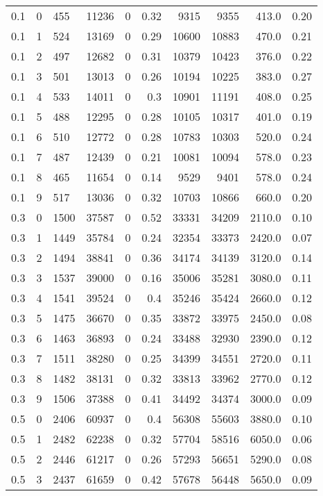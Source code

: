 \documentclass{scrartcl}
\theoremstyle{plain}
\begin{document}
\begin{table}[!ht]
\begin{tabular}{|lll|rrr|rrr|r|}
\makeatletter{}0.1 & 0 & 455 & 11236 & 0  & 0.32 & 9315 & 9355 & 413.0 & 0.20 \\ 
 0.1 & 1 & 524 & 13169 & 0  & 0.29 & 10600 & 10883 & 470.0 & 0.21 \\ 
 0.1 & 2 & 497 & 12682 & 0  & 0.31 & 10379 & 10423 & 376.0 & 0.22 \\ 
 0.1 & 3 & 501 & 13013 & 0  & 0.26 & 10194 & 10225 & 383.0 & 0.27 \\ 
 0.1 & 4 & 533 & 14011 & 0  & 0.3 & 10901 & 11191 & 408.0 & 0.25 \\ 
 0.1 & 5 & 488 & 12295 & 0  & 0.28 & 10105 & 10317 & 401.0 & 0.19 \\ 
 0.1 & 6 & 510 & 12772 & 0  & 0.28 & 10783 & 10303 & 520.0 & 0.24 \\ 
 0.1 & 7 & 487 & 12439 & 0  & 0.21 & 10081 & 10094 & 578.0 & 0.23 \\ 
 0.1 & 8 & 465 & 11654 & 0  & 0.14 & 9529 & 9401 & 578.0 & 0.24 \\ 
 0.1 & 9 & 517 & 13036 & 0  & 0.32 & 10703 & 10866 & 660.0 & 0.20 \\ 
 0.3 & 0 & 1500 & 37587 & 0  & 0.52 & 33331 & 34209 & 2110.0 & 0.10 \\ 
 0.3 & 1 & 1449 & 35784 & 0  & 0.24 & 32354 & 33373 & 2420.0 & 0.07 \\ 
 0.3 & 2 & 1494 & 38841 & 0  & 0.36 & 34174 & 34139 & 3120.0 & 0.14 \\ 
 0.3 & 3 & 1537 & 39000 & 0  & 0.16 & 35006 & 35281 & 3080.0 & 0.11 \\ 
 0.3 & 4 & 1541 & 39524 & 0  & 0.4 & 35246 & 35424 & 2660.0 & 0.12 \\ 
 0.3 & 5 & 1475 & 36670 & 0  & 0.35 & 33872 & 33975 & 2450.0 & 0.08 \\ 
 0.3 & 6 & 1463 & 36893 & 0  & 0.24 & 33488 & 32930 & 2390.0 & 0.12 \\ 
 0.3 & 7 & 1511 & 38280 & 0  & 0.25 & 34399 & 34551 & 2720.0 & 0.11 \\ 
 0.3 & 8 & 1482 & 38131 & 0  & 0.32 & 33813 & 33962 & 2770.0 & 0.12 \\ 
 0.3 & 9 & 1506 & 37388 & 0  & 0.41 & 34492 & 34374 & 3000.0 & 0.09 \\ 
 0.5 & 0 & 2406 & 60937 & 0  & 0.4 & 56308 & 55603 & 3880.0 & 0.10 \\ 
 0.5 & 1 & 2482 & 62238 & 0  & 0.32 & 57704 & 58516 & 6050.0 & 0.06 \\ 
 0.5 & 2 & 2446 & 61217 & 0  & 0.26 & 57293 & 56651 & 5290.0 & 0.08 \\ 
 0.5 & 3 & 2437 & 61659 & 0  & 0.42 & 57678 & 56448 & 5650.0 & 0.09 \\ 

\end{tabular}
\end{table}
\end{document}
